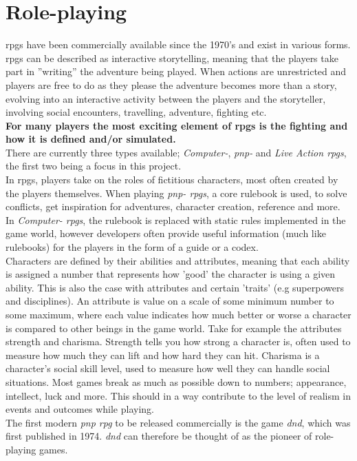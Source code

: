 \section{Role-playing}
\ac{rpgs} have been commercially available since the 1970's and exist in various forms. \ac{rpgs} can be described as interactive storytelling, meaning that the players take part in ''writing'' the adventure being played. When actions are unrestricted and players are free to do as they please the adventure becomes more than a story, evolving into an interactive activity between the players and the storyteller, involving social encounters, travelling, adventure, fighting etc.\\
\textbf{For many players the most exciting element of \ac{rpgs} is the fighting and how it is defined and/or simulated.}\\
There are currently three types available; \emph{Computer-}, \emph{\ac{pnp}-} and \emph{Live Action \ac{rpgs}}, the first two being a focus in this project.\\
In \ac{rpgs}, players take on the roles of fictitious characters, most often created by the players themselves.
When playing \emph{\ac{pnp}- \ac{rpgs}}, a core rulebook is used, to solve conflicts, get inspiration for adventures, character creation, reference and more. In \emph{Computer- \ac{rpgs}}, the rulebook is replaced with static rules implemented in the game world, however developers often provide useful information (much like rulebooks) for the players in the form of a guide or a codex.\\
Characters are defined by their abilities and attributes, meaning that each ability is assigned a number that represents how 'good' the character is using a given ability. This is also the case with attributes and certain 'traits' (e.g superpowers and disciplines). An attribute is value on a scale of some minimum number to some maximum, where each value indicates how much better or worse a character is compared to other beings in the game world. Take for example the attributes strength and charisma. Strength tells you how strong a character is, often used to measure how much they can lift and how hard they can hit. Charisma is a character's social skill level, used to measure how well they can handle social situations. Most games break as much as possible down to numbers; appearance, intellect, luck and more.
This should in a way contribute to the level of realism in events and outcomes while playing.\\
The first modern \emph{\ac{pnp} \ac{rpg}} to be released commercially is the game \emph{\ac{dnd}}, which was first published in 1974.\cite{wikidnd}
\emph{\ac{dnd}} can therefore be thought of as the pioneer of role-playing games.

